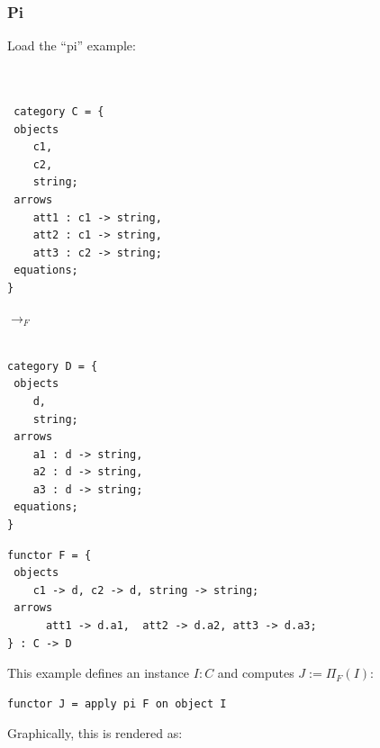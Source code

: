 \documentclass[12pt]{article}
\begin{document}
\subsubsection{Pi}

Load the ``pi'' example:

 \begin{minipage}{0.4\textwidth}
\begin{verbatim} 


 category C = {
 objects 
 	c1, 
 	c2,
 	string;
 arrows
	att1 : c1 -> string,
	att2 : c1 -> string, 
	att3 : c2 -> string;
 equations;
}
    \end{verbatim}
  \end{minipage}
   \hspace{.5in} $\to_F$ \hspace{.5in}
  \begin{minipage}{0.4\textwidth}
\begin{verbatim} 

category D = {
 objects 
 	d,
 	string;
 arrows
 	a1 : d -> string, 
 	a2 : d -> string, 
 	a3 : d -> string;
 equations;
}

\end{verbatim} \end{minipage}
\begin{verbatim}
functor F = {
 objects 
 	c1 -> d, c2 -> d, string -> string;
 arrows
	  att1 -> d.a1,  att2 -> d.a2, att3 -> d.a3;
} : C -> D

\end{verbatim}
This example defines an instance $I : C$ and computes $J := \Pi_F(I)$:
\begin{verbatim}
functor J = apply pi F on object I
\end{verbatim}
Graphically, this is rendered as:
\end{document}
